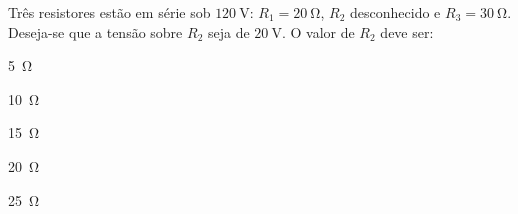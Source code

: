 \begin{questao}[2]{}
Três resistores estão em série sob $\SI{120}{\volt}$: $R_1=\SI{20}{\ohm}$,
$R_2$ desconhecido e $R_3=\SI{30}{\ohm}$. Deseja-se que a tensão sobre $R_2$
seja de $\SI{20}{\volt}$. O valor de $R_2$ deve ser:
\begin{alternativas}[3]
\item \SI{5}{\ohm}
\item \SI{10}{\ohm}
\item \SI{15}{\ohm}
\item \SI{20}{\ohm}
\item \SI{25}{\ohm}
\end{alternativas}
\end{questao}

\blocoaprofundamento

